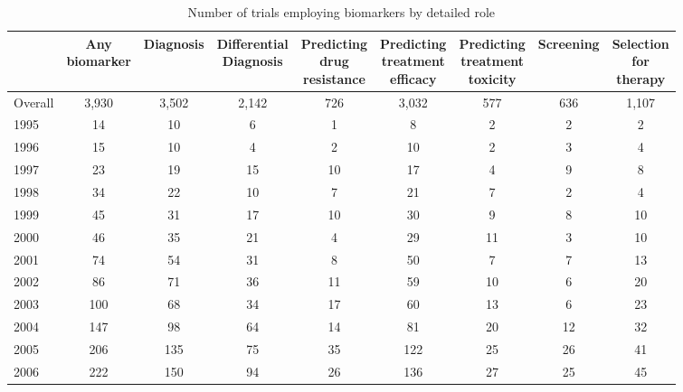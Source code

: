 \begin{table}[htbp]\centering
\caption{Number of trials employing biomarkers by detailed role}
\begin{tabular}{l*{8}{c}}
\hline\hline
          &\shortstack{Any\\biomarker}&Diagnosis&\shortstack{Differential\\Diagnosis}&\shortstack{Predicting\\drug\\resistance}&\shortstack{Predicting\\treatment\\efficacy}&\shortstack{Predicting\\treatment\\toxicity}&Screening&\shortstack{Selection\\for\\therapy}\\
\hline
Overall   &    3,930&    3,502&    2,142&      726&    3,032&      577&      636&    1,107\\
1995      &       14&       10&        6&        1&        8&        2&        2&        2\\
1996      &       15&       10&        4&        2&       10&        2&        3&        4\\
1997      &       23&       19&       15&       10&       17&        4&        9&        8\\
1998      &       34&       22&       10&        7&       21&        7&        2&        4\\
1999      &       45&       31&       17&       10&       30&        9&        8&       10\\
2000      &       46&       35&       21&        4&       29&       11&        3&       10\\
2001      &       74&       54&       31&        8&       50&        7&        7&       13\\
2002      &       86&       71&       36&       11&       59&       10&        6&       20\\
2003      &      100&       68&       34&       17&       60&       13&        6&       23\\
2004      &      147&       98&       64&       14&       81&       20&       12&       32\\
2005      &      206&      135&       75&       35&      122&       25&       26&       41\\
2006      &      222&      150&       94&       26&      136&       27&       25&       45\\

\end{tabular}
\end{table}

